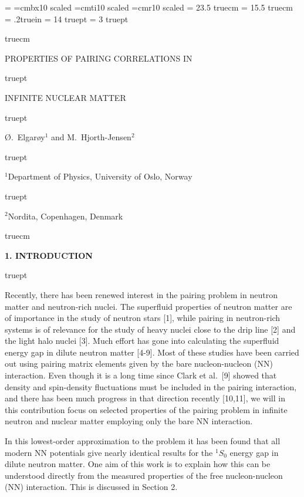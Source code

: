 \magnification= 
\font\bigbfont=cmbx10 scaled
\font\bigifont=cmti10 scaled
\font\bigrfont=cmr10 scaled
\vsize = 23.5 truecm
\hsize = 15.5 truecm
\hoffset = .2truein
\baselineskip = 14 truept
\parskip = 3 truept
\nopagenumbers

\topinsert
{} truecm
\endinsert

\centerline{\bigbfont PROPERTIES OF PAIRING CORRELATIONS IN  }
 truept
\centerline{\bigbfont INFINITE NUCLEAR MATTER}
 truept
\centerline{\bigifont \O.\ Elgar\o y$^1$ and M.\ Hjorth-Jensen$^2$}
 truept
\centerline{\bigrfont $^1$Department of Physics, University of Oslo, Norway}
 truept
\centerline{\bigrfont $^2$Nordita, Copenhagen, Denmark}
 truecm


\centerline{\bf 1.  INTRODUCTION}
 truept

Recently, there has been renewed interest in the pairing problem in 
neutron matter and neutron-rich nuclei. The superfluid properties 
of neutron matter are of importance in the study of neutron stars 
[1], while pairing in neutron-rich systems is of relevance 
for the study of heavy nuclei close to the drip line [2]
and the light halo nuclei [3].  Much effort has gone into 
calculating the superfluid energy gap in dilute neutron matter 
[4-9].  Most of these studies have been carried 
out using pairing matrix elements given by the bare nucleon-nucleon 
(NN) interaction.  Even though it is a long time since  
Clark et al.\ [9] showed that density and spin-density 
fluctuations must be included in the pairing interaction, and there 
has been much progress in that direction recently [10,11], 
we will in this contribution focus on selected properties 
of the pairing problem in infinite neutron and nuclear matter
employing only the 
bare NN interaction.  

In this lowest-order approximation to the 
problem it has been found that all modern 
NN potentials give nearly identical results for the $^1S_0$ energy 
gap in dilute neutron matter.  One aim of this work is to 
explain how this can 
be understood directly from the measured properties of the free 
nucleon-nucleon (NN) interaction. This is discussed in Section 2.   

